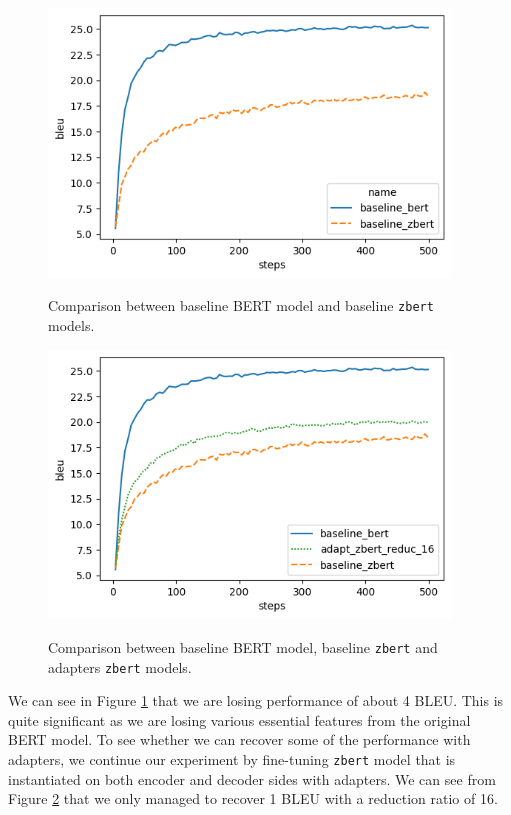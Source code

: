 \begin{figure}[]
    {\includegraphics[width=0.95\textwidth]{img/baseline_zbert.png}}
    \centering
    \caption{Comparison between baseline BERT model and baseline \texttt{zbert} models.}
    \label{img:baseline_zbert}
\end{figure}

\begin{figure}[]
    {\includegraphics[width=0.95\textwidth]{img/adapter_zbert.png}}
    \centering
    \caption{Comparison between baseline BERT model, baseline \texttt{zbert} and adapters \texttt{zbert} models.}
    \label{img:adapter_zbert}
\end{figure}

We can see in Figure \ref{img:baseline_zbert} that we are losing performance of about 4 BLEU. This is quite significant as we are losing various essential features from the original BERT model. To see whether we can recover some of the performance with adapters, we continue our experiment by fine-tuning \texttt{zbert} model that is instantiated on both encoder and decoder sides with adapters. We can see from Figure \ref{img:adapter_zbert} that we only managed to recover 1 BLEU with a reduction ratio of 16.

